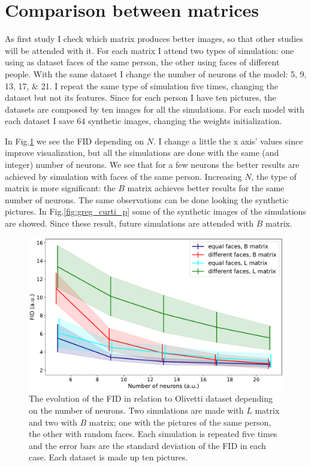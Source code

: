 \documentclass[a4paper,12pt]{article}
\begin{document}
\section{Comparison between matrices}
As first study I check which matrix produces better images, so that other studies will be attended with it.
For each matrix I attend two types of simulation: one using as dataset faces of the same person, the other using faces of different people.
With the same dataset I change the number of neurons of the model: \numlist{5;9;13;17;21}.
I repeat the same type of simulation five times, changing the dataset but not its features.
Since for each person I have ten pictures, the datasets are composed by ten images for all the simulations.
For each model with each dataset I save $64$ synthetic images, changing the weights initialization.

In Fig.\ref{fig:greg_curti_g} we see the FID depending on $N$.
I change a little the x axis' values since improve visualization, but all the simulations are done with the same (and integer) number of neurons.
We see that for a few neurons the better results are achieved by simulation with faces of the same person.
Increasing $N$, the type of matrix is more significant: the $B$ matrix achieves better results for the same number of neurons.
The same observations can be done looking the synthetic pictures.
In Fig.\ref{fig:greg_curti_p} some of the synthetic images of the simulations are showed.
Since these result, future simulations are attended with $B$ matrix.

\begin{figure}[!hbt]
  \centering
  \includegraphics[width=.9\columnwidth]{greg_curti.pdf}
  \caption[FID of $L$ versus $B$ matrix]{The evolution of the FID in relation to Olivetti dataset depending on the number of neurons.
  Two simulations are made with $L$ matrix and two with $B$ matrix; one with the pictures of the same person, the other with random faces.
  Each simulation is repeated five times and the error bars are the standard deviation of the FID in each case.
  Each dataset is made up ten pictures.
  }
  \label{fig:greg_curti_g}
\end{figure}
\end{document}
